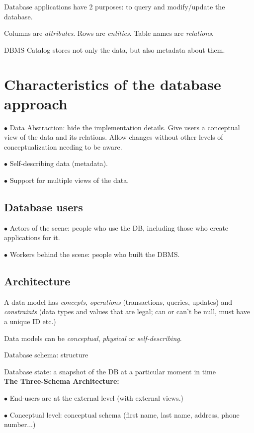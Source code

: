 \documentclass[english,openany]{book}
\begin{document}
    Database applications have 2 purposes: to query and modify/update the database.

    Columns are \textit{attributes}. Rows are \textit{entities}. Table names are \textit{relations}.

    DBMS Catalog stores not only the data, but also metadata about them.

    \section{Characteristics of the database approach}

    $\bullet$ Data Abstraction: hide the implementation details. Give users a conceptual view of the data and its relations. Allow changes without other levels of conceptualization needing to be aware.

    $\bullet$ Self-describing data (metadata).

    $\bullet$ Support for multiple views of the data.

    \subsection{Database users}

    $\bullet$ Actors of the scene: people who use the DB, including those who create applications for it.

    $\bullet$ Workers behind the scene: people who built the DBMS.

    \subsection{Architecture}

    A data model has \textit{concepts}, \textit{operations} (transactions, queries, updates) and \textit{constraints} (data types and values that are legal; can or can't be null, must have a unique ID etc.)

    Data models can be \textit{conceptual}, \textit{physical} or \textit{self-describing}.

    Database schema: structure

    Database state: a snapshot of the DB at a particular moment in time\\

    \textbf{The Three-Schema Architecture: }

    $\bullet$ End-users are at the external level (with external views.)

    $\bullet$ Conceptual level: conceptual schema  (first name, last name, address, phone number...)
\end{document}
